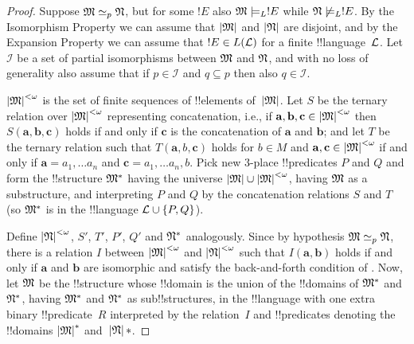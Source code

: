 \documentclass[../../include/open-logic-section]{subfiles}
\begin{document}
\begin{proof}
Suppose $\mathfrak M \simeq_p \mathfrak N$, but for some $!E$ also
$\mathfrak M \models_L !E$ while $\mathfrak N \not\models_L !E$. By the
Isomorphism Property we can assume that $\left| \mathfrak M \right|$ and $\left| \mathfrak N \right|$
are disjoint, and by the Expansion Property we can assume that $!E \in
L(\mathcal L)$ for a finite !!{language}~$\mathcal L$. Let $\mathcal{I}$
be a set of partial isomorphisms between $\mathfrak M$ and
$\mathfrak N$, and with no loss of generality also assume that if $p
\in \mathcal{I}$ and $q \subseteq p$ then also $q \in \mathcal{I}$.

$\left| \mathfrak M \right|^{<\omega}$ is the set of finite sequences of !!{element}s
of~$\left| \mathfrak M \right|$. Let $S$ be the ternary relation over $\left| \mathfrak M \right|^{<\omega}$
representing concatenation, i.e., if $\mathbf{a}, \mathbf{b},
\mathbf{c} \in \left| \mathfrak M \right|^{<\omega}$ then $S(\mathbf{a}, \mathbf{b},
\mathbf{c})$ holds if and only if $\mathbf{c}$ is the concatenation of
$\mathbf{a}$ and $\mathbf{b}$; and let $T$ be the ternary relation
such that $T(\mathbf{a}, b, \mathbf{c})$ holds for $b \in M$ and
$\mathbf{a}, \mathbf{c} \in \left| \mathfrak M \right|^{<\omega}$ if and only if $\mathbf{a} =
a_1, \dots a_n$ and $\mathbf{c} = a_1, \dots a_n, b$.  Pick new
3-place !!{predicate}s $P$ and $Q$ and form the !!{structure}
$\mathfrak M^*$ having the universe $\left| \mathfrak M \right| \cup \left| \mathfrak M \right|^{<\omega}$, having
$\mathfrak M$ as a substructure, and interpreting $P$ and $Q$ by the
concatenation relations $S$ and $T$ (so $\mathfrak M^*$ is in the
!!{language} $\mathcal L \cup \{ P, Q\}$).

Define $\left| \mathfrak N \right|^{<\omega}$, $S'$, $T'$, $P'$, $Q'$ and
$\mathfrak N^*$ analogously. Since by hypothesis $\mathfrak M \simeq_p
\mathfrak N$, there is a relation $I$ between $\left| \mathfrak M \right|^{<\omega}$
and $\left| \mathfrak N \right|^{<\omega}$ such that $I(\mathbf{a}, \mathbf{b})$
holds if and only if $\mathbf{a}$ and $\mathbf{b}$ are isomorphic and
satisfy the back-and-forth condition of
.  Now, let $\mathfrak M$ be the
!!{structure} whose !!{domain} is the union of the !!{domain}s of
$\mathfrak M^*$ and $\mathfrak N^*$, having $\mathfrak M^*$ and
$\mathfrak N^*$ as sub!!{structure}s, in the !!{language} with one extra
binary !!{predicate}~$R$ interpreted by the relation~$I$ and
!!{predicate}s denoting the !!{domain}s $\left| \mathfrak M \right|^*$
and~$\left| \mathfrak N \right|*$.


\end{proof}
\end{document}
